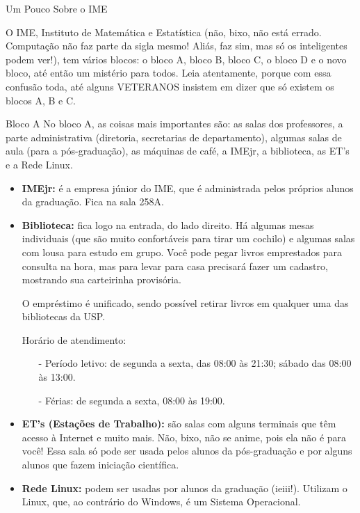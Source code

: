 \begin{secao}{Um Pouco Sobre o IME}

O IME, Instituto de Matemática e Estatística (não, bixo, não está errado. Computação não faz parte da sigla mesmo! Aliás, faz sim, mas só os inteligentes podem ver!), tem vários blocos: o bloco A, bloco B, bloco C, o bloco D e o novo bloco, até então um mistério para todos. Leia atentamente, porque com essa confusão toda, até alguns VETERANOS insistem em dizer que só existem os blocos A, B e C.

\begin{subsecao}{Bloco A}
No bloco A, as coisas mais importantes são: as salas dos professores, a parte
administrativa (diretoria, secretarias de departamento), algumas salas de aula
(para a pós-graduação), as máquinas de café, a IMEjr, a biblioteca, as ET's e
a Rede Linux.

\begin{itemize}

\item {\bf IMEjr:} é a empresa júnior do IME, que é administrada pelos próprios
alunos da graduação. Fica na sala 258A.

\item {\bf Biblioteca:} fica logo na entrada, do lado direito. Há algumas mesas
individuais (que são muito confortáveis para tirar um cochilo) e algumas salas
com lousa para estudo em grupo. Você pode pegar livros emprestados para consulta
na hora, mas para levar para casa precisará fazer um cadastro, mostrando sua
carteirinha provisória.

O empréstimo é unificado, sendo possível retirar livros em qualquer uma das bibliotecas da USP.

Horário de atendimento:
\begin{itemize}
\item[-] Período letivo: de segunda a sexta, das 08:00 às 21:30; sábado das 08:00 às 13:00.
\item[-] Férias: de segunda a sexta, 08:00 às 19:00.
\end{itemize}

\item {\bf ET's (Estações de Trabalho):} são salas com alguns terminais que têm
acesso à Internet e muito mais. Não, bixo, não se anime, pois ela não é para
você! Essa sala só pode ser usada pelos alunos da pós-graduação e por alguns
alunos que fazem iniciação científica.

\item {\bf Rede Linux:} podem ser usadas por alunos da graduação (ieiii!).
 Utilizam o Linux, que, ao contrário do Windows, é um Sistema Operacional.


\end{itemize}
\end{subsecao}
\end{secao}

